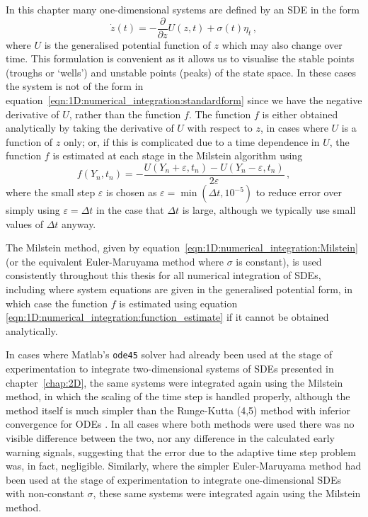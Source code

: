 {{	In this chapter many one-dimensional systems are defined by an SDE in the form
		\begin{equation}
		\label{eqn:1D:numerical_integration:potentialform}
			\dot{z}(t) = -\frac{\partial}{\partial z}U(z,t) + \sigma(t)\eta_t\,,
		\end{equation}
	where $U$ is the generalised potential function of $z$ which may also change over time. This formulation is convenient as it allows us to visualise the stable points (troughs or `wells') and unstable points (peaks) of the state space. In these cases the system is not of the form in equation~\ref{eqn:1D:numerical_integration:standardform} since we have the negative derivative of $U$, rather than the function $f$. The function $f$ is either obtained analytically by taking the derivative of $U$ with respect to $z$, in cases where $U$ is a function of $z$ only; or, if this is complicated due to a time dependence in $U$, the function $f$ is estimated at each stage in the Milstein algorithm using 
		\begin{equation}
		\label{eqn:1D:numerical_integration:function_estimate}
			f(Y_n, t_n) = 	-\frac{U(Y_n+\varepsilon, t_n)-U(Y_n-\varepsilon, t_n)}{2\varepsilon}\,,
		\end{equation}
	where the small step $\varepsilon$ is chosen as $\varepsilon=\min(\Delta t, 10^{-5})$ to reduce error over simply using $\varepsilon=\Delta t$ in the case that $\Delta t$ is large, although we typically use small values of $\Delta t$ anyway. 
	
	The Milstein method, given by equation~\ref{eqn:1D:numerical_integration:Milstein} (or the equivalent Euler-Maruyama method where $\sigma$ is constant), is used consistently throughout this thesis for all numerical integration of SDEs, including where system equations are given in the generalised potential form, in which case the function $f$ is estimated using equation \ref{eqn:1D:numerical_integration:function_estimate} if it cannot be obtained analytically.
	
	In cases where Matlab's \texttt{ode45} solver had already been used at the stage of experimentation to integrate two-dimensional systems of SDEs presented in chapter~\ref{chap:2D}, the same systems were integrated again using the Milstein method, in which the scaling of the time step is handled properly, although the method itself is much simpler than the Runge-Kutta (4,5) method with inferior convergence for ODEs \citep{mackevicius2013introduction}. In all cases where both methods were used there was no visible difference between the two, nor any difference in the calculated early warning signals, suggesting that the error due to the adaptive time step problem was, in fact, negligible. Similarly, where the simpler Euler-Maruyama method had been used at the stage of experimentation to integrate one-dimensional SDEs with non-constant $\sigma$, these same systems were integrated again using the Milstein method.
	
}}
